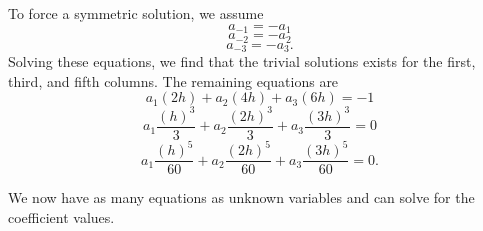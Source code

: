 \noindent To force a symmetric solution, we assume 
\begin{equation}
a_{-1} = -a_1
\end{equation}
\begin{equation}
a_{-2} = -a_2
\end{equation}
\begin{equation}
a_{-3} = -a_3 .
\end{equation}
Solving these equations, we find that the trivial solutions exists for the first, third, and fifth columns. The remaining equations are
\begin{equation}
a_1 (2h)+ a_2 (4h)+ a_3 (6h) = -1
\end{equation}
\begin{equation}
a_1 \frac{(h)^3}{3}     +a_2  \frac{(2h)^3}{3}    +a_3 \frac{(3h)^3}{3}     = 0
\end{equation}
\begin{equation}
a_1 \frac{(h)^5}{60}     +a_2  \frac{(2h)^5}{60}    +a_3 \frac{(3h)^5}{60}     = 0.
\end{equation}

\noindent We now have as many equations as unknown variables and can solve for the coefficient values. 





































